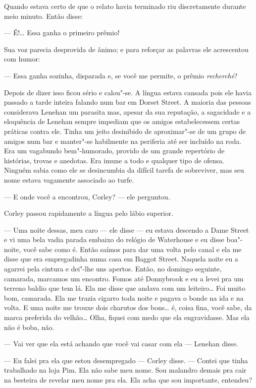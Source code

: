 Quando estava certo de que o relato havia terminado riu discretamente durante
meio minuto.  Então disse:

--- É!\ldots{}  Essa ganha o primeiro prêmio!

Sua voz parecia desprovida de ânimo; e para reforçar as palavras ele
acrescentou com humor:

--- Essa ganha sozinha, disparada e, se você me permite, o prêmio
\textit{recherché!}

Depois de dizer isso ficou sério e calou"-se.  A língua estava cansada pois ele
havia passado a tarde inteira falando num bar em Dorset Street.  A maioria das
pessoas considerava Lenehan um parasita mas, apesar da sua reputação, a
sagacidade e a eloquência de Lenehan sempre impediam que os amigos
estabelecessem certas práticas contra ele.  Tinha um jeito desinibido de
aproximar"-se de um grupo de amigos num bar e manter"-se habilmente na periferia
até ser incluído na roda.  Era um vagabundo bem"-humorado, provido de um grande
repertório de histórias, trovas e anedotas.  Era imune a todo e qualquer tipo
de ofensa.  Ninguém sabia como ele se desincumbia da difícil tarefa de
sobreviver, mas seu nome estava vagamente associado ao turfe.

--- E onde você a encontrou, Corley? --- ele perguntou.

Corley passou rapidamente a língua pelo lábio superior.

--- Uma noite dessas, meu caro --- ele disse --- eu estava descendo a Dame
Street e vi uma bela vadia parada embaixo do relógio de Waterhouse e eu disse
boa"-noite, você sabe como é.  Então saímos para dar uma volta pelo canal e ela
me disse que era empregadinha numa casa em Baggot Street.  Naquela noite eu a
agarrei pela cintura e dei"-lhe uns apertos.  Então, no domingo seguinte,
camarada, marcamos um encontro.  Fomos até Donnybrook e eu a levei pra um
terreno baldio que tem lá.  Ela me disse que andava com um leiteiro\ldots{} Foi
muito bom, camarada.  Ela me trazia cigarro toda noite e pagava o bonde na ida
e na volta.  E uma noite me trouxe dois charutos dos bons\ldots{} é, coisa
fina, você sabe, da marca preferida do velhão\ldots{} Olha, fiquei com medo que
ela engravidasse.  Mas ela não é boba, não.

--- Vai ver que ela está achando que você vai casar com ela --- Lenehan disse.

--- Eu falei pra ela que estou desempregado --- Corley disse.  --- Contei
que tinha trabalhado na loja Pim.  Ela não sabe meu nome.  Sou malandro demais
pra cair na besteira de revelar meu nome pra ela. Ela acha que sou importante,
entendeu?

